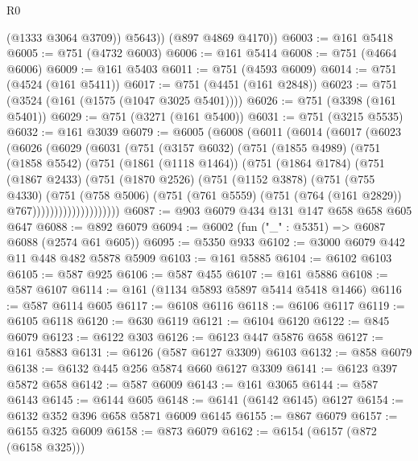 \begin{lexlean}{R0}
\begin{coremodule}
            (@1333 @3064 @3709))
          @5643))
      (@897 @4869 @4170))
@6003 := @161 @5418
@6005 := @751 (@4732 @6003)
@6006 := @161 @5414
@6008 := @751 (@4664 @6006)
@6009 := @161 @5403
@6011 := @751 (@4593 @6009)
@6014 := @751 (@4524 (@161 @5411))
@6017 := @751 (@4451 (@161 @2848))
@6023 := @751 (@3524 (@161 (@1575 (@1047 @3025 @5401))))
@6026 := @751 (@3398 (@161 @5401))
@6029 := @751 (@3271 (@161 @5400))
@6031 := @751 (@3215 @5535)
@6032 := @161 @3039
@6079 := @6005
    (@6008
      (@6011
        (@6014
          (@6017
            (@6023
              (@6026
                (@6029
                  (@6031
                    (@751
                      (@3157 @6032)
                      (@751
                        (@1855 @4989)
                        (@751
                          (@1858 @5542)
                          (@751
                            (@1861 (@1118 @1464))
                            (@751
                              (@1864 @1784)
                              (@751
                                (@1867 @2433)
                                (@751
                                  (@1870 @2526)
                                  (@751
                                    (@1152 @3878)
                                    (@751
                                      (@755 @4330)
                                      (@751
                                        (@758 @5006)
                                        (@751
                                          (@761 @5559)
                                          (@751 (@764 (@161 @2829)) @767))))))))))))))))))))
@6087 := @903 @6079 @434 @131 @147 @658 @658 @605 @647
@6088 := @892 @6079
@6094 := @6002 (fun ("_" : @5351) => @6087 @6088 (@2574 @61 @605))
@6095 := @5350 @933
@6102 := @3000 @6079 @442 @11 @448 @482 @5878 @5909
@6103 := @161 @5885
@6104 := @6102 @6103
@6105 := @587 @925
@6106 := @587 @455
@6107 := @161 @5886
@6108 := @587 @6107
@6114 := @161 (@1134 @5893 @5897 @5414 @5418 @1466)
@6116 := @587 @6114 @605
@6117 := @6108 @6116
@6118 := @6106 @6117
@6119 := @6105 @6118
@6120 := @630 @6119
@6121 := @6104 @6120
@6122 := @845 @6079
@6123 := @6122 @303
@6126 := @6123 @447 @5876 @658
@6127 := @161 @5883
@6131 := @6126 (@587 @6127 @3309) @6103
@6132 := @858 @6079
@6138 := @6132 @445 @256 @5874 @660 @6127 @3309
@6141 := @6123 @397 @5872 @658
@6142 := @587 @6009
@6143 := @161 @3065
@6144 := @587 @6143
@6145 := @6144 @605
@6148 := @6141 (@6142 @6145) @6127
@6154 := @6132 @352 @396 @658 @5871 @6009 @6145
@6155 := @867 @6079
@6157 := @6155 @325 @6009
@6158 := @873 @6079
@6162 := @6154 (@6157 (@872 (@6158 @325)))

\end{coremodule}
\end{lexlean}
